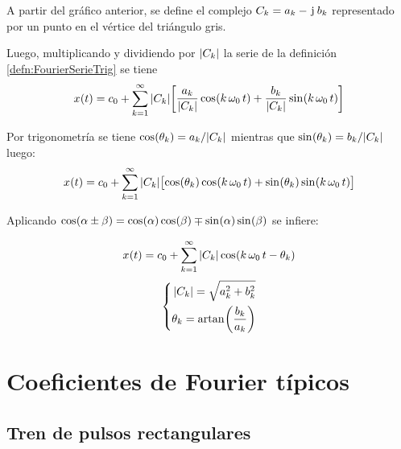 \begin{center}
    \def\svgwidth{0.6\linewidth}
    
\end{center}

A partir del gráfico anterior, se define el complejo $C_\kth = a_\kth - \iu \, b_\kth$ representado por un punto en el vértice del triángulo gris.

Luego, multiplicando y dividiendo por $\norm{C_\kth}$ la serie de la definición \ref{defn:FourierSerieTrig} se tiene
\[
    \fx[x]{t} = c_0 + \sum_{\kth=1}^{\infty} \norm{C_\kth} \inBrackets{ \dfrac{a_\kth}{\norm{C_\kth}} \fx[\cos]{\kth \, \omega_0 \, t} + \dfrac{b_\kth}{\norm{C_\kth}} \fx[\sin]{\kth \, \omega_0 \, t} }
\]

Por trigonometría se tiene $\fx[\cos]{\theta_\kth} = a_\kth / \norm{C_\kth}$ mientras que $\fx[\sin]{\theta_\kth} = b_\kth / \norm{C_\kth}$ luego:
\[
    \fx[x]{t} = c_0 + \sum_{\kth=1}^{\infty} \norm{C_\kth} \inBrackets{ \fx[\cos]{\theta_\kth} \fx[\cos]{\kth \, \omega_0 \, t} + \fx[\sin]{\theta_\kth} \fx[\sin]{\kth \, \omega_0 \, t} }
\]

Aplicando $\fx[\cos]{\alpha \pm \beta} = \fx[\cos]{\alpha} \fx[\cos]{\beta} \mp \fx[\sin]{\alpha} \fx[\sin]{\beta}$ se infiere:

\begin{mdframed}[style=DefinitionFrame]
    \begin{defn}
        \label{defn:FourierSerieArm}
    \end{defn}
    \[
        \fx[x]{t} = c_0 + \sum_{\kth=1}^{\infty} \norm{C_\kth} \fx[\cos]{\kth \, \omega_0 \, t - \theta_\kth}
    \]
    \[
    \left\{
    \begin{aligned}
        \norm{C_\kth} = \sqrt{a_\kth^2 + b_\kth^2}
        \\
        \theta_\kth = \fx[\artan]{\frac{b_\kth}{a_\kth}}
    \end{aligned}
    \right.
\]
\end{mdframed}

\section{Coeficientes de Fourier típicos}

\subsection{Tren de pulsos rectangulares}

